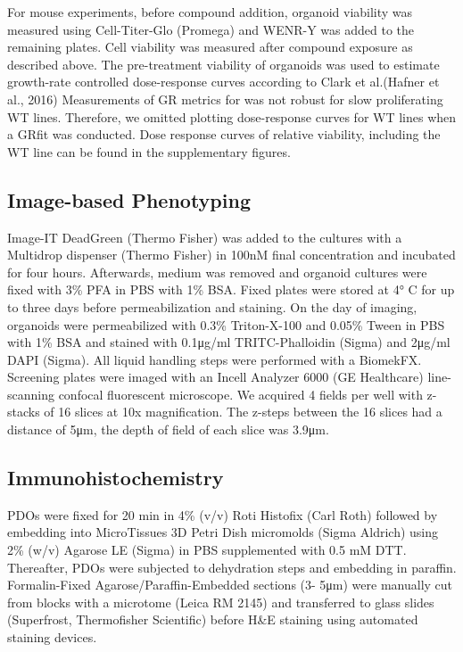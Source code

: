 \begin{flushleft}
For mouse experiments, before compound addition, organoid viability was measured using Cell-Titer-Glo (Promega) and WENR-Y was added to the remaining plates. Cell viability was measured after compound exposure as described above. The pre-treatment viability of organoids was used to estimate growth-rate controlled dose-response curves according to Clark et al.(Hafner et al., 2016) Measurements of GR metrics for was not robust for slow proliferating WT lines. Therefore, we omitted plotting dose-response curves for WT lines when a GRfit was conducted. Dose response curves of relative viability, including the WT line can be found in the supplementary figures. 

\subsection{Image-based Phenotyping}
Image-IT DeadGreen (Thermo Fisher) was added to the cultures with a Multidrop dispenser (Thermo Fisher) in 100nM final concentration and incubated for four hours. Afterwards, medium was removed and organoid cultures were fixed with 3\% PFA in PBS with 1\% BSA. Fixed plates were stored at 4° C for up to three days before permeabilization and staining. On the day of imaging, organoids were permeabilized with 0.3\% Triton-X-100 and 0.05\% Tween in PBS with 1\% BSA and stained with 0.1μg/ml TRITC-Phalloidin (Sigma) and 2μg/ml DAPI (Sigma). All liquid handling steps were performed with a BiomekFX. Screening plates were imaged with an Incell Analyzer 6000 (GE Healthcare) line-scanning confocal fluorescent microscope. We acquired 4 fields per well with z-stacks of 16 slices at 10x magnification. The z-steps between the 16 slices had a distance of 5μm, the depth of field of each slice was 3.9μm.

\subsection{Immunohistochemistry}
PDOs were fixed for 20 min in 4\% (v/v) Roti Histofix (Carl Roth) followed by embedding into MicroTissues 3D Petri Dish micromolds (Sigma Aldrich) using 2\% (w/v) Agarose LE (Sigma) in PBS supplemented with 0.5 mM DTT. Thereafter, PDOs were subjected to dehydration steps and embedding in paraffin. Formalin-Fixed Agarose/Paraffin-Embedded sections (3- 5μm) were manually cut from blocks with a microtome (Leica RM 2145) and transferred to glass slides (Superfrost, Thermofisher Scientific) before H&E staining using automated staining devices.


\end{flushleft}
